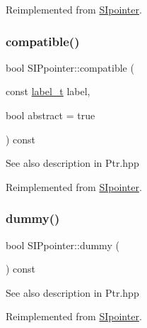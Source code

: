 Reimplemented from \mbox{\hyperlink{group__table_ga6bdbea8e7013194f834be17932efe642}{S\+Ipointer}}.

\mbox{\label{group__table_gabf87df773f8e0f628e0bae79e88097db}} 
\subsubsection{\texorpdfstring{compatible()}{compatible()}\hspace{0.1cm}{\footnotesize\ttfamily [2/2]}}
{\footnotesize\ttfamily bool S\+I\+Ppointer\+::compatible (\begin{DoxyParamCaption}\item[{const \mbox{\hyperlink{group__output_ga22fde970e635fcf63962743b2d5c441d}{label\+\_\+t}}}]{label,  }\item[{bool}]{abstract = {\ttfamily true} }\end{DoxyParamCaption}) const\hspace{0.3cm}{\ttfamily [virtual]}}

\begin{DoxySeeAlso}{See also}
description in Ptr.\+hpp 
\end{DoxySeeAlso}


Reimplemented from \mbox{\hyperlink{group__table_gaca7d3c4d141ecf2874a5e5512e0c02ff}{S\+Ipointer}}.

\mbox{\label{group__table_gaf830b0bf9d24b53e4674de49308b7853}} 
\subsubsection{\texorpdfstring{dummy()}{dummy()}\hspace{0.1cm}{\footnotesize\ttfamily [2/2]}}
{\footnotesize\ttfamily bool S\+I\+Ppointer\+::dummy (\begin{DoxyParamCaption}{ }\end{DoxyParamCaption}) const\hspace{0.3cm}{\ttfamily [virtual]}}

\begin{DoxySeeAlso}{See also}
description in Ptr.\+hpp 
\end{DoxySeeAlso}


Reimplemented from \mbox{\hyperlink{group__table_ga555753e41af94ac201a0c8c99babb83b}{S\+Ipointer}}.

